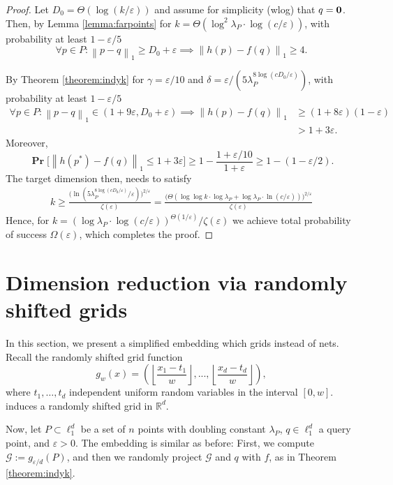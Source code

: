 \documentclass[10pt,a4paper,twoside]{book}
\newcommand{\mbf}[1]{\mbox{\boldmath$\rm{#1}$}}
\newcommand{\rd}{\mathbb{R}^{d}}
\newcommand{\eps}{\varepsilon}
\newcommand{\grid}{\mathcal{G}}
\newcommand{\norm}[1]{\left \rVert {#1} \right \rVert}
\DeclareMathOperator*{\prob}{\mathbf{Pr}}
\theoremstyle{definition}
\theoremstyle{remark}
\begin{document}
\begin{proof}
Let $D_0 = \Theta(\log (k/\eps))$ and assume for simplicity (wlog) that $q=\mbf{0}$. Then, by Lemma \ref{lemma:farpoints} for $k = \Theta \left( \log^{2}{\lambda_P} \cdot \log ( c / \eps)  \right)$, with probability at least $1- \eps/5$
\begin{equation*}
    \forall p \in P : \norm{p-q}_1 \geq D_0 + \eps \implies \norm{h(p) - f(q)}_1 \geq 4.
\end{equation*}

By Theorem \ref{theorem:indyk} for $\gamma = \eps/10$ and $\delta = \eps/ (5\lambda_P^{8\log{(c D_0 / \eps)}})$, with probability at least $1-\eps/5$
\begin{align*}
\forall p\in P: \norm{p-q}_1 \in (1+9\eps, D_0+ \eps)  \implies \norm{h(p) - f(q)}_1 &\geq (1 + 8\eps)(1 - \eps) \\
&> 1 + 3\eps.
\end{align*}
Moreover,
\[
\prob \big[\norm{h(p^*) - f(q)}_1 \leq 1 + 3\eps  \big] \geq 1 -\frac{1+ \eps/10}{1+ \varepsilon} \geq 1 - (1 - \eps/2).
\]
The target dimension then, needs to satisfy
\begin{align*}
    k \geq \frac{\big( \ln{ ( 5\lambda_P^{8\log{(c D_0 / \eps)}} / \eps ) } \big) ^{2/\eps}}{ \zeta(\eps)} = \frac{\big( \Theta ( \log \log k  \cdot \log{\lambda_P} + \log{\lambda_P} \cdot \ln(c / \eps) ) \big) ^{2/\eps}}{ \zeta(\eps)}
\end{align*}
Hence, for $k = \left( \log{\lambda_P} \cdot \log(c / \eps) \right)^{\Theta(1/\eps)} / \zeta(\eps) $ we achieve total probability of success $\Omega(\eps)$, which completes the proof.
\end{proof}

\section{Dimension reduction via randomly shifted grids}
In this section, we present a simplified embedding which grids instead of nets. 
Recall the randomly shifted grid function
\[g_{w}(x)=\left(\left\lfloor \frac{x_1-t_1}{w} \right\rfloor,...,\left\lfloor \frac{x_d-t_d}{w} \right\rfloor \right),\]
where $t_1,\ldots,t_d$ independent uniform random variables in the interval $[0,w]$. 
induces a randomly shifted grid in $\rd$.

Now, let $P \subset \ell_1^d$ be a set of $n$ points with doubling constant $\lambda_P$, $q \in \ell_1^d$ a query point, and $\eps>0$. The embedding is similar as before: First, we compute $\mathcal{G} := g_{\eps /d}(P)$, and then we randomly project $\grid$ and $q$ with $f$, as in Theorem \ref{theorem:indyk}.
\end{document}
